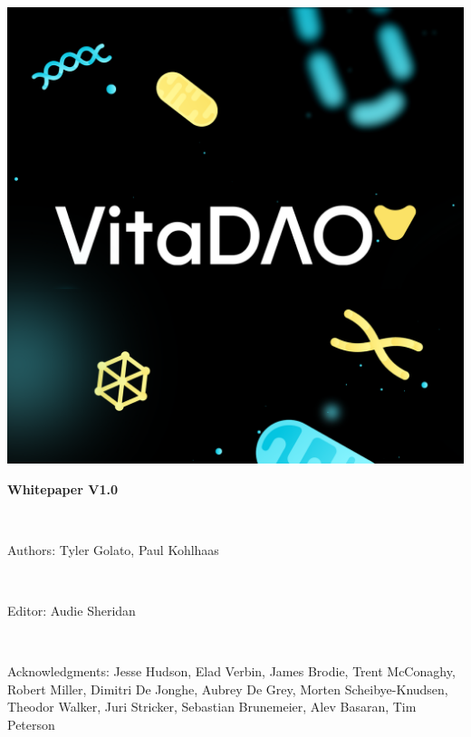 \documentclass[10pt,letterpaper]{article}
\begin{document}
\begin{titlepage}
\centering
\includegraphics[width=0.8\linewidth]{images/VitaDAO Opengraph.png} 
\\
\vspace{36pt}
{\begin{LARGE} \textbf{Whitepaper V1.0}\end{LARGE}}
\\
\vspace{18pt}
{\begin{Large}{Authors: Tyler Golato, Paul Kohlhaas}\end{Large}}
\\
\vspace{18pt}
{\begin{large}{Editor: Audie Sheridan}\end{large}}
\\
\vspace{18pt}
{\begin{large}{Acknowledgments:  Jesse Hudson, Elad Verbin, James Brodie, Trent McConaghy, Robert Miller, Dimitri De Jonghe, Aubrey De Grey, Morten Scheibye-Knudsen, Theodor Walker, Juri Stricker, Sebastian Brunemeier, Alev Basaran, Tim Peterson}\end{large}}
\\
\end{titlepage}

\newpage

\end{document}
